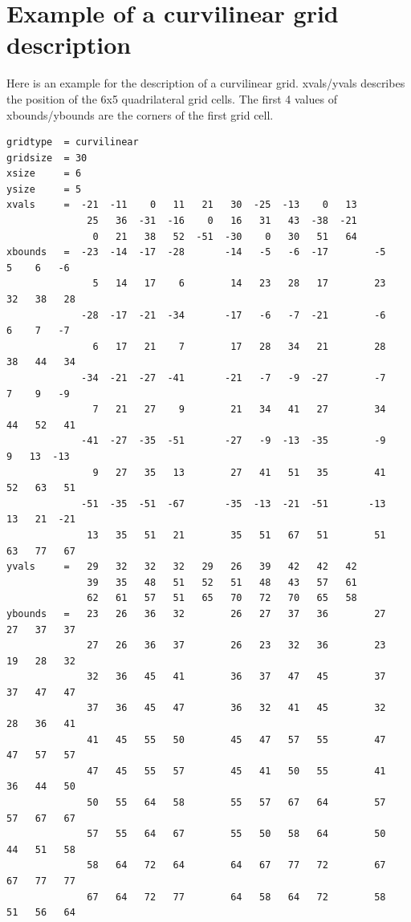 \section{Example of a curvilinear grid description}
Here is an example for the {\CDO} description of a curvilinear grid.
xvals/yvals describes the position of the 6x5 quadrilateral grid cells.
The first 4 values of xbounds/ybounds are the corners of the first grid cell.
\begin{lstlisting}[frame=single, backgroundcolor=\color{pyellow}, basicstyle=\footnotesize]
gridtype  = curvilinear
gridsize  = 30
xsize     = 6
ysize     = 5
xvals     =  -21  -11    0   11   21   30  -25  -13    0   13
              25   36  -31  -16    0   16   31   43  -38  -21
               0   21   38   52  -51  -30    0   30   51   64
xbounds   =  -23  -14  -17  -28       -14   -5   -6  -17        -5    5    6   -6
               5   14   17    6        14   23   28   17        23   32   38   28
             -28  -17  -21  -34       -17   -6   -7  -21        -6    6    7   -7
               6   17   21    7        17   28   34   21        28   38   44   34
             -34  -21  -27  -41       -21   -7   -9  -27        -7    7    9   -9
               7   21   27    9        21   34   41   27        34   44   52   41
             -41  -27  -35  -51       -27   -9  -13  -35        -9    9   13  -13
               9   27   35   13        27   41   51   35        41   52   63   51
             -51  -35  -51  -67       -35  -13  -21  -51       -13   13   21  -21
              13   35   51   21        35   51   67   51        51   63   77   67
yvals     =   29   32   32   32   29   26   39   42   42   42
              39   35   48   51   52   51   48   43   57   61
              62   61   57   51   65   70   72   70   65   58
ybounds   =   23   26   36   32        26   27   37   36        27   27   37   37
              27   26   36   37        26   23   32   36        23   19   28   32
              32   36   45   41        36   37   47   45        37   37   47   47
              37   36   45   47        36   32   41   45        32   28   36   41
              41   45   55   50        45   47   57   55        47   47   57   57
              47   45   55   57        45   41   50   55        41   36   44   50
              50   55   64   58        55   57   67   64        57   57   67   67
              57   55   64   67        55   50   58   64        50   44   51   58
              58   64   72   64        64   67   77   72        67   67   77   77
              67   64   72   77        64   58   64   72        58   51   56   64
\end{lstlisting}

